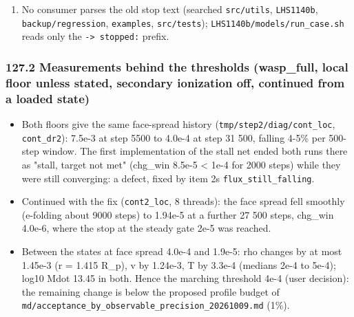 \documentclass[english,a4paper]{my_memo}
\providecommand{\tightlist}{\setlength{\itemsep}{0pt}\setlength{\parskip}{0pt}}
\begin{document}
\begin{enumerate}
  chg\_win \textless{} march\_change\_th (out of the PLM stage), not on a du stop flag.
  The cold-start runaway that staging was made for did not occur
  (MEASURED: wasp\_full from its cold IC, coupling on from step 0, 20 000
  steps, no NaN; wasp\_full\_newton from its cold IC, Newton finish at log10
  Mdot 13.29, as with staging; \texttt{tmp/step2/diag/imm\_*}).
\item
  No consumer parses the old stop text (searched \texttt{src/utils}, \texttt{LHS1140b},
  \texttt{backup/regression}, \texttt{examples}, \texttt{src/tests}); \texttt{LHS1140b/models/run\_case.sh}
  reads only the \texttt{-\textgreater{}\ stopped:} prefix.
\end{enumerate}

\subsubsection{127.2 Measurements behind the thresholds (wasp\_full, local floor unless stated, secondary ionization off, continued from a loaded state)}\label{1272-measurements-behind-the-thresholds-wasp_full-local-floor-unless-stated-secondary-ionization-off-continued-from-a-loaded-state}

\begin{itemize}
\tightlist
\item
  Both floors give the same face-spread history (\texttt{tmp/step2/diag/cont\_loc},
  \texttt{cont\_dr2}): 7.5e-3 at step 5500 to 4.0e-4 at step 31 500, falling 4-5\%
  per 500-step window. The first implementation of the stall net ended both
  runs there as "stall, target not met" (chg\_win 8.5e-5 \textless{} 1e-4 for 2000
  steps) while they were still converging: a defect, fixed by item 2\textquotesingle s
  \texttt{flux\_still\_falling}.
\item
  Continued with the fix (\texttt{cont2\_loc}, 8 threads): the face spread fell
  smoothly (e-folding about 9000 steps) to 1.94e-5 at a further 27 500 steps,
  chg\_win 4.0e-6, where the stop at the steady gate 2e-5 was reached.
\item
  Between the states at face spread 4.0e-4 and 1.9e-5: rho changes by at most
  1.45e-3 (r = 1.415 R\_p), v by 1.24e-3, T by 3.3e-4 (medians 2e-4 to 5e-4);
  log10 Mdot 13.45 in both. Hence the marching threshold 4e-4 (user decision):
  the remaining change is below the proposed profile budget of
  \texttt{md/acceptance\_by\_observable\_precision\_20261009.md} (1\%).
\end{itemize}
\end{document}
